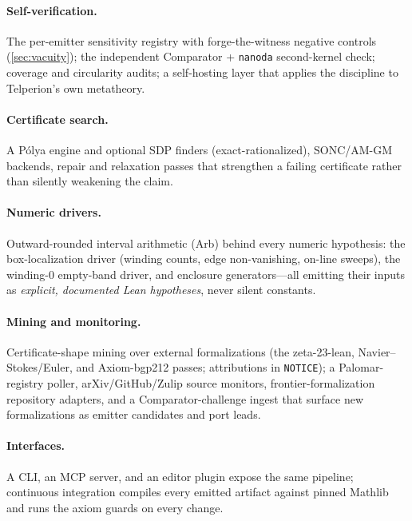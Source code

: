 \paragraph{Self-verification.} The per-emitter sensitivity registry with
forge-the-witness negative controls (\cref{sec:vacuity}); the independent
Comparator + \texttt{nanoda} second-kernel check; coverage and circularity
audits; a self-hosting layer that applies the discipline to Telperion's own
metatheory.

\paragraph{Certificate search.} A P\'olya engine and optional SDP finders
(exact-rationalized), SONC/AM-GM backends, repair and relaxation passes that
strengthen a failing certificate rather than silently weakening the claim.

\paragraph{Numeric drivers.} Outward-rounded interval arithmetic (Arb) behind
every numeric hypothesis: the box-localization driver (winding counts, edge
non-vanishing, on-line sweeps), the winding-$0$ empty-band driver, and
enclosure generators---all emitting their inputs as \emph{explicit, documented
Lean hypotheses}, never silent constants.

\paragraph{Mining and monitoring.} Certificate-shape mining over external
formalizations (the zeta-23-lean, Navier--Stokes/Euler, and Axiom-bgp212
passes; attributions in \texttt{NOTICE}); a Palomar-registry poller,
arXiv/GitHub/Zulip source monitors, frontier-formalization repository adapters,
and a Comparator-challenge ingest that surface new formalizations as emitter
candidates and port leads.

\paragraph{Interfaces.} A CLI, an MCP server, and an editor plugin expose the
same pipeline; continuous integration compiles every emitted artifact against
pinned Mathlib and runs the axiom guards on every change.